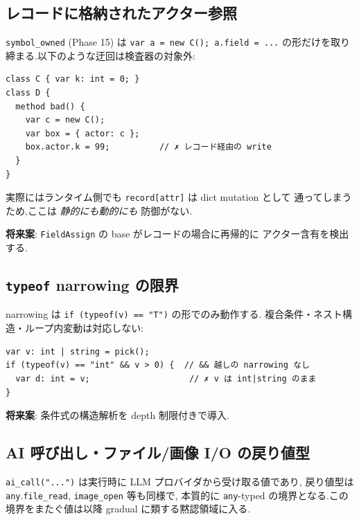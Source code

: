 \documentclass[11pt,a4paper]{article}
\newcommand{\code}[1]{\texttt{\small #1}}
\begin{document}
\subsection{レコードに格納されたアクター参照}

\code{symbol\_owned} (Phase 15) は \code{var a = new C(); a.field = ...}
の形だけを取り締まる.以下のような迂回は検査器の対象外:

\begin{lstlisting}
class C { var k: int = 0; }
class D {
  method bad() {
    var c = new C();
    var box = { actor: c };
    box.actor.k = 99;          // ✗ レコード経由の write
  }
}
\end{lstlisting}

実際にはランタイム側でも \code{record[attr]} は dict mutation として
通ってしまうため,ここは \emph{静的にも動的にも} 防御がない.

\textbf{将来案}: \code{FieldAssign} の base がレコードの場合に再帰的に
アクター含有を検出する.

\subsection{\code{typeof} narrowing の限界}

narrowing は \code{if (typeof(v) == "T")} の形でのみ動作する.
複合条件・ネスト構造・ループ内変動は対応しない:

\begin{lstlisting}
var v: int | string = pick();
if (typeof(v) == "int" && v > 0) {  // && 越しの narrowing なし
  var d: int = v;                    // ✗ v は int|string のまま
}
\end{lstlisting}

\textbf{将来案}: 条件式の構造解析を depth 制限付きで導入.

\subsection{AI 呼び出し・ファイル/画像 I/O の戻り値型}

\code{ai\_call("...")} は実行時に LLM プロバイダから受け取る値であり,
戻り値型は \code{any}.\code{file\_read}, \code{image\_open} 等も同様で,
本質的に \code{any}-typed の境界となる.この境界をまたぐ値は以降
gradual に類する黙認領域に入る.
\end{document}
